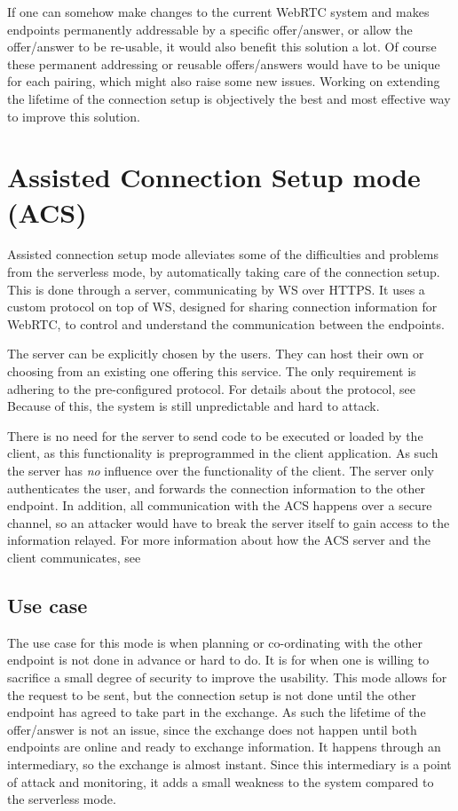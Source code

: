 If one can somehow make changes to the current WebRTC system and makes endpoints permanently addressable by a specific offer/answer, or allow the offer/answer to be re-usable, it would also benefit this solution a lot. Of course these permanent addressing or reusable offers/answers would have to be unique for each pairing, which might also raise some new issues. Working on extending the lifetime of the connection setup is objectively the best and most effective way to improve this solution.
%
%
\section{Assisted Connection Setup mode \textbf(ACS)}
%
Assisted connection setup mode alleviates some of the difficulties and problems from the serverless mode, by automatically taking care of the connection setup. This is done through a server, communicating by WS over HTTPS. It uses a custom protocol on top of WS, designed for sharing connection information for WebRTC, to control and understand the communication between the endpoints.

The server can be explicitly chosen by the users. They can host their own or choosing from an existing one offering this service. The only requirement is adhering to the pre-configured protocol. For details about the protocol, see  Because of this, the system is still unpredictable and hard to attack.

There is no need for the server to send code to be executed or loaded by the client, as this functionality is preprogrammed in the client application. As such the server has \emph{no} influence over the functionality of the client. The server only authenticates the user, and forwards the connection information to the other endpoint.
In addition, all communication with the ACS happens over a secure channel, so an attacker would have to break the server itself to gain access to the information relayed. For more information about how the ACS server and the client communicates, see 
%
\subsection{Use case}
%
The use case for this mode is when planning or co-ordinating with the other endpoint is not done in advance or hard to do. It is for when one is willing to sacrifice a small degree of security to improve the usability. This mode allows for the request to be sent, but the connection setup is not done until the other endpoint has agreed to take part in the exchange. As such the lifetime of the offer/answer is not an issue, since the exchange does not happen until both endpoints are online and ready to exchange information. It happens through an intermediary, so the exchange is almost instant. Since this intermediary is a point of attack and monitoring, it adds a small weakness to the system compared to the serverless mode.
%

